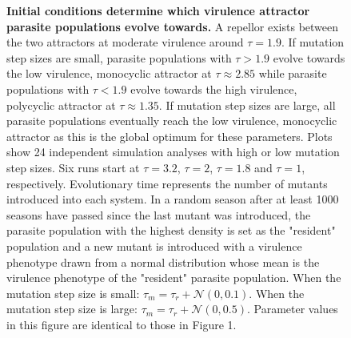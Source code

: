 \documentclass{article}
\begin{document}
\begin{figure}[hb!]
    \caption{\textbf{Initial conditions determine which virulence attractor parasite populations evolve towards.} A repellor exists between the two attractors at moderate virulence around $\tau = 1.9$. If mutation step sizes are small, parasite populations with $\tau > 1.9$ evolve towards the low virulence, monocyclic attractor at $\tau \approx 2.85$ while parasite populations with $\tau < 1.9$ evolve towards the high virulence, polycyclic attractor at $\tau \approx 1.35$. If mutation step sizes are large, all parasite populations eventually reach the low virulence, monocyclic attractor as this is the global optimum for these parameters. Plots show 24 independent simulation analyses with high or low mutation step sizes. Six runs start at $\tau = 3.2$, $\tau = 2$, $\tau = 1.8$ and $\tau = 1$, respectively. Evolutionary time represents the number of mutants introduced into each system. In a random season after at least 1000 seasons have passed since the last mutant was introduced, the parasite population with the highest density is set as the "resident" population and a new mutant is introduced with a virulence phenotype drawn from a normal distribution whose mean is the virulence phenotype of the "resident" parasite population. When the mutation step size is small: $\tau_{m} = \tau_{r} + \mathcal{N}(0,0.1)$. When the mutation step size is large: $\tau_{m} = \tau_{r} + \mathcal{N}(0,0.5)$. Parameter values in this figure are identical to those in Figure 1. 
    }
\end{figure}
\end{document}
